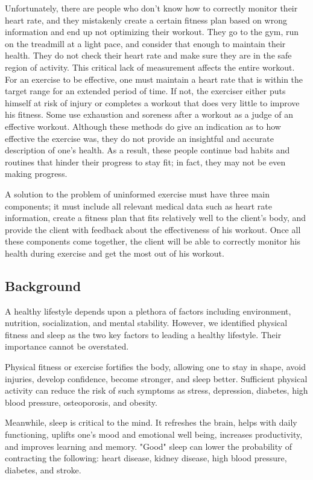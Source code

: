 \documentclass[letterpaper,english]{scrreprt}
\begin{document}
Unfortunately, there are people who don't know how to correctly monitor their heart rate, and they mistakenly create a certain fitness plan based on wrong information and end up not optimizing their workout. They go to the gym, run on the treadmill at a light pace, and consider that enough to maintain their health. They do not check their heart rate and make sure they are in the safe region of activity. This critical lack of measurement affects the entire workout. For an exercise to be effective, one must maintain a heart rate that is within the target range for an extended period of time. If not, the exerciser either puts himself at risk of injury or completes a workout that does very little to improve his fitness. Some use exhaustion and soreness after a workout as a judge of an effective workout. Although these methods do give an indication as to how effective the exercise was, they do not provide an insightful and accurate description of one's health. As a result, these people continue bad habits and routines that hinder their progress to stay fit; in fact, they may not be even making progress.
 
A solution to the problem of uninformed exercise must have three main components; it must include all relevant medical data such as heart rate information, create a fitness plan that fits relatively well to the client's body, and provide the client with feedback about the effectiveness of his workout. Once all these components come together, the client will be able to correctly monitor his health during exercise and get the most out of his workout.
 
\subsection{Background}
A healthy lifestyle depends upon a plethora of factors including environment, nutrition, socialization, and mental stability. However, we identified physical fitness and sleep as the two key factors to leading a healthy lifestyle. Their importance cannot be overstated.
 
Physical fitness or exercise fortifies the body, allowing one to stay in shape, avoid injuries, develop confidence, become stronger, and sleep better. Sufficient physical activity can reduce the risk of such symptoms as stress, depression, diabetes, high blood pressure, osteoporosis, and obesity.
 
Meanwhile, sleep is critical to the mind. It refreshes the brain, helps with daily functioning, uplifts one's mood and emotional well being, increases productivity, and improves learning and memory. "Good" sleep can lower the probability of contracting the following: heart disease, kidney disease, high blood pressure, diabetes, and stroke.
 
\end{document}
